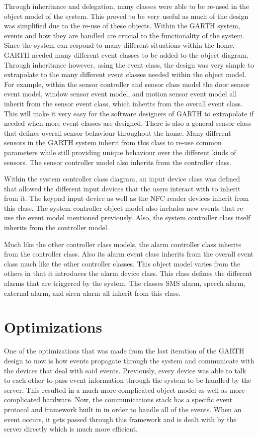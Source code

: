 \documentclass{report}
\begin{document}
Through inheritance and delegation, many classes were able to be re-used in the
object model of the system. This proved to be very useful as much of the design
was simplified due to the re-use of these objects. Within the GARTH system,
events and how they are handled are crucial to the functionality of the system.
Since the system can respond to many different situations within the home,
GARTH needed many different event classes to be added to the object diagram.
Through inheritance however, using the event class, the design was very simple
to extrapolate to the many different event classes needed within the object
model. For example, within the sensor controller and sensor class model the
door sensor event model, window sensor event model, and motion sensor event
model all inherit from the sensor event class, which inherits from the overall
event class. This will make it very easy for the software designers of GARTH to
extrapolate if needed when more event classes are designed. There is also a
general sensor class that defines overall sensor behaviour throughout the home.
Many different sensors in the GARTH system inherit from this class to re-use
common parameters while still providing unique behaviour over the different
kinds of sensors. The sensor controller model also inherits from the controller
class.

Within the system controller class diagram, an input device class was defined
that allowed the different input devices that the users interact with to
inherit from it. The keypad input device as well as the NFC reader devices
inherit from this class. The system controller object model also includes new
events that re-use the event model mentioned previously. Also, the system
controller class itself inherits from the controller model.

Much like the other controller class models, the alarm controller class
inherits from the controller class. Also its alarm event class inherits from
the overall event class much like the other controller classes. This object
model varies from the others in that it introduces the alarm device class. This
class defines the different alarms that are triggered by the system. The
classes SMS alarm, speech alarm, external alarm, and siren alarm all inherit
from this class.

\section{Optimizations}

One of the optimizations that was made from the last iteration of the GARTH
design to now is how events propagate through the system and communicate with
the devices that deal with said events. Previously, every device was able to
talk to each other to pass event information through the system to be handled by
the server. This resulted in a much more complicated object model as well as
more complicated hardware. Now, the communications stack has a specific event
protocol and framework built in in order to handle all of the events. When an 
event occurs, it gets passed through this framework and is dealt with by the
server directly which is much more efficient.
\end{document}

